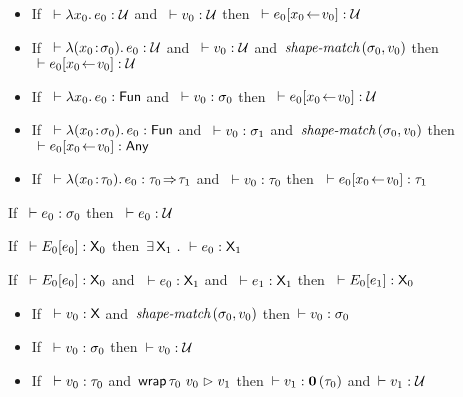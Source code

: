\documentclass[nonacm,10pt]{acmart}
\begin{document}
\begin{lemma}\leavevmode
  \begin{itemize}
    \item
      If\ $~\vdash \lambda x_0.\, e_0 : \mathcal{U}$
      and\ $~\vdash v_0 : \mathcal{U}$
      then\ $~\vdash e_0[x_0\!\leftarrow\!v_0] : \mathcal{U}$
    \item
      If\ $~\vdash \lambda (x_0\!:\!\sigma_0).\, e_0 : \mathcal{U}$
      and\ $~\vdash v_0 : \mathcal{U}$
      and\ $\textit{shape-match}\,(\sigma_0, v_0)$
      then\ $~\vdash e_0[x_0\!\leftarrow\!v_0] : \mathcal{U}$
    \item
      If\ $~\vdash \lambda x_0.\, e_0 : \mathsf{Fun}$
      and\ $~\vdash v_0 : \sigma_0$
      then\ $~\vdash e_0[x_0\!\leftarrow\!v_0] : \mathcal{U}$
    \item
      If\ $~\vdash \lambda (x_0\!:\!\sigma_0).\, e_0 : \mathsf{Fun}$
      and\ $~\vdash v_0 : \sigma_1$
      and\ $\textit{shape-match}\,(\sigma_0, v_0)$
      then\ $~\vdash e_0[x_0\!\leftarrow\!v_0] : \mathsf{Any}$
    \item
      If\ $~\vdash \lambda (x_0\!:\!\tau_0).\, e_0 : \tau_0\!\Rightarrow\!\tau_1$
      and\ $~\vdash v_0 : \tau_0$
      then\ $~\vdash e_0[x_0\!\leftarrow\!v_0] : \tau_1$
  \end{itemize}
\end{lemma}

\begin{lemma}[S to U]
  If\ $~\vdash e_0 : \sigma_0$
  then\ $~\vdash e_0 : \mathcal{U}$
\end{lemma}

\begin{lemma}
  If\ $~\vdash E_0[e_0] : \mathsf{X}_0$
  then\ $\exists\,\mathsf{X}_1~.~ \vdash e_0 : \mathsf{X}_1$
\end{lemma}

\begin{lemma}
  If\ $~\vdash E_0[e_0] : \mathsf{X}_0$
  and\ $~\vdash e_0 : \mathsf{X}_1$
  and\ $~\vdash e_1 : \mathsf{X}_1$
  then\ $~\vdash E_0[e_1] : \mathsf{X}_0$
\end{lemma}

\begin{lemma}[boundary]\leavevmode
  \begin{itemize}
    \item
      If\ $~\vdash v_0 : \mathsf{X}$
      and\ $\textit{shape-match}\,(\sigma_0, v_0)$
      then\ $\vdash v_0 : \sigma_0$
    \item
      If\ $~\vdash v_0 : \sigma_0$
      then\ $\vdash v_0 : \mathcal{U}$
    \item
      If\ $~\vdash v_0 : \tau_0$
      and\ $\mathsf{wrap}\,\tau_0~v_0 \vartriangleright v_1$
      then\ $\vdash v_1 : \mathbf{0}\,(\tau_0)$
      and\ $\vdash v_1 : \mathcal{U}$
  \end{itemize}
\end{lemma}
\end{document}
